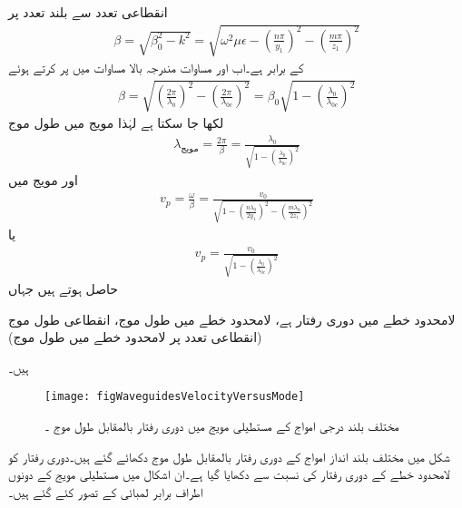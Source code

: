 انقطاعی تعدد سے بلند تعدد   پر
\begin{align}\label{مساوات_مویج_آزاد_اور_قید_زاویائی_مستقل}
\beta=\sqrt{\beta_0^2-k^2}=\sqrt{\omega^2 \mu \epsilon -\left(\frac{n \pi}{y_1}\right)^2-\left(\frac{m \pi}{z_1}\right)^2}
\end{align}
کے برابر ہے۔اب  اور مساوات  مندرجہ بالا مساوات میں پر کرتے ہوئے
\begin{align}
\beta=\sqrt{\left(\frac{2\pi}{\lambda_0}\right)^2-\left(\frac{2\pi}{\lambda_{0c}}\right)^2}=\beta_0 \sqrt{1-\left(\frac{\lambda_0}{\lambda_{0c}}\right)^2}
\end{align}
لکھا جا سکتا ہے لہٰذا  مویج میں طول موج
\begin{align}
\lambda_{\text{مویج}}=\frac{2\pi}{\beta}=\frac{\lambda_0}{\sqrt{1-\left(\frac{\lambda_0}{\lambda_{0c}}\right)^2}}
\end{align}
اور مویج میں  
\begin{align}
v_p =\frac{\omega}{\beta}=\frac{v_0}{\sqrt{1-\left(\frac{n \lambda_0}{2 y_1}\right)^2-\left(\frac{m \lambda_0}{2 z_1}\right)^2}}
\end{align}
یا
\begin{align}
v_p=\frac{v_0}{\sqrt{1-\left(\frac{\lambda_0}{\lambda_{0c}}\right)^2}}
\end{align}
حاصل ہوتے ہیں جہاں
\begin{description}
 لامحدود خطے میں دوری رفتار  ہے،
 لامحدود خطے میں طول موج،
انقطاعی طول موج (انقطاعی تعدد پر لامحدود خطے میں طول موج)
\end{description}
ہیں۔
\begin{figure}
\centering
\texttt{[image: figWaveguidesVelocityVersusMode]}
\caption{مختلف بلند درجی امواج کے مستطیلی مویج میں دوری رفتار بالمقابل طول موج ۔}
\label{شکل_مویج_دوری_رفتار_مختلف_بلند_انداز}
\end{figure}

شکل  میں مختلف بلند انداز امواج  کے دوری رفتار بالمقابل طول موج  دکھائے گئے ہیں۔دوری رفتار کو لامحدود خطے کے دوری رفتار   کی نسبت سے دکھایا گیا ہے۔ان اشکال میں مستطیلی مویج کے دونوں اطراف برابر لمبائی  کے تصور کئے گئے ہیں۔

